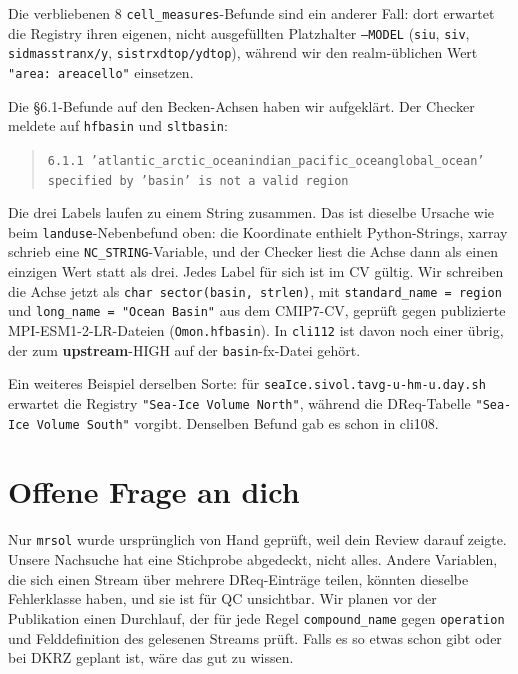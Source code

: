 \documentclass[11pt,a4paper]{article}
\newcommand{\code}[1]{\texttt{\small #1}}
\newcommand{\upstream}{\textcolor{blue!60!black}{\textbf{upstream}}}
\begin{document}
Die verbliebenen 8 \code{cell\_measures}-Befunde sind ein anderer Fall: dort
erwartet die Registry ihren eigenen, nicht ausgef\"ullten Platzhalter
\code{--MODEL} (\code{siu}, \code{siv}, \code{sidmasstranx/y},
\code{sistrxdtop/ydtop}), w\"ahrend wir den realm-\"ublichen Wert
\code{"area: areacello"} einsetzen.

Die \S6.1-Befunde auf den Becken-Achsen haben wir aufgekl\"art. Der Checker
meldete auf \code{hfbasin} und \code{sltbasin}:

\begin{quote}
\code{6.1.1 'atlantic\_arctic\_oceanindian\_pacific\_oceanglobal\_ocean'
specified by 'basin' is not a valid region}
\end{quote}

Die drei Labels laufen zu einem String zusammen. Das ist dieselbe Ursache wie
beim \code{landuse}-Nebenbefund oben: die Koordinate enthielt Python-Strings,
xarray schrieb eine \code{NC\_STRING}-Variable, und der Checker liest die Achse
dann als einen einzigen Wert statt als drei. Jedes Label f\"ur sich ist im CV
g\"ultig. Wir schreiben die Achse jetzt als \code{char sector(basin, strlen)},
mit \code{standard\_name = region} und \code{long\_name = "Ocean Basin"} aus dem
CMIP7-CV, gepr\"uft gegen publizierte MPI-ESM1-2-LR-Dateien (\code{Omon.hfbasin}).
In \code{cli112} ist davon noch einer \"ubrig, der zum
\upstream-HIGH auf der \code{basin}-fx-Datei geh\"ort.

Ein weiteres Beispiel derselben Sorte: f\"ur
\code{seaIce.sivol.tavg-u-hm-u.day.sh} erwartet die Registry
\code{"Sea-Ice Volume North"}, w\"ahrend die DReq-Tabelle
\code{"Sea-Ice Volume South"} vorgibt. Denselben Befund gab es schon in cli108.

\section{Offene Frage an dich}

Nur \code{mrsol} wurde urspr\"unglich von Hand gepr\"uft, weil dein Review darauf
zeigte. Unsere Nachsuche hat eine Stichprobe abgedeckt, nicht alles. Andere
Variablen, die sich einen Stream \"uber mehrere DReq-Eintr\"age teilen, k\"onnten
dieselbe Fehlerklasse haben, und sie ist f\"ur QC unsichtbar. Wir planen vor der
Publikation einen Durchlauf, der f\"ur jede Regel \code{compound\_name} gegen
\code{operation} und Felddefinition des gelesenen Streams pr\"uft. Falls es so etwas
schon gibt oder bei DKRZ geplant ist, w\"are das gut zu wissen.
\end{document}
